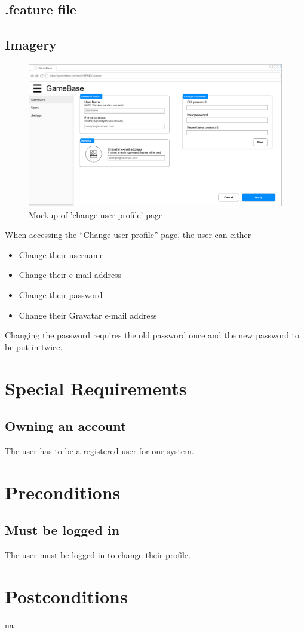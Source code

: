 \documentclass[a4paper,12pt,chapterprefix=false,bibliography=totoc,listof=totoc,book]{scrreprt}
\begin{document}
    \section{.feature file}
    \begin{minipage}{\textwidth}
    
    \end{minipage}

    \section{Imagery}
    \begin{figure}[H]
        \includegraphics[width=\textwidth]{diagramms/UCChangeUserProfileMockup.png}
        \caption{Mockup of 'change user profile' page}
        \label{fig:mockup}
    \end{figure}
    When accessing the \enquote{Change user profile} page, the user can either
    \begin{itemize}
        \item Change their username
        \item Change their e-mail address
        \item Change their password
        \item Change their Gravatar e-mail address
    \end{itemize}
    Changing the password requires the old password once and the new password to be put in twice.

    \chapter{Special Requirements}
    \section{Owning an account}
    The user has to be a registered user for our system.

    \chapter{Preconditions}
    \section{Must be logged in}
    The user must be logged in to change their profile.

    \chapter{Postconditions}
    \gls{na}
\end{document}
